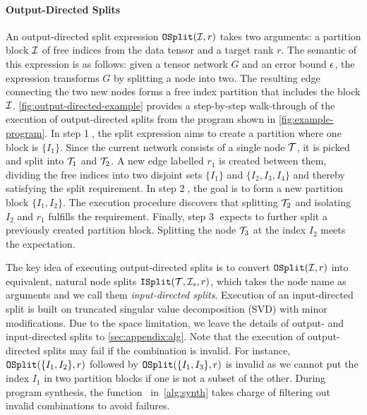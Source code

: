 \paragraph{Output-Directed Splits}
%
An output-directed split expression $\mathtt{OSplit}(\mathcal{I}, r)$ takes two arguments: a partition block $\mathcal{I}$ of free indices from the data tensor and a target rank $r$.
%
The semantic of this expression is as follows: given a tensor network $G$ and an error bound $\epsilon$, the expression transforms $G$ by splitting a node into two.
%
The resulting edge connecting the two new nodes forms a free index partition that includes the block $\mathcal{I}$.
%
\cref{fig:output-directed-example} provides a step-by-step walk-through of the execution of output-directed splits from the program shown in \cref{fig:example-program}.
%
In step \textcircled{\scriptsize 1}, the split expression aims to create a partition where one block is $\{I_1\}$.
%
Since the current network consists of a single node $\mathcal{T}$, it is picked and split into $\mathcal{T}_1$ and $\mathcal{T}_2$.
%
A new edge labelled $r_1$ is created between them, dividing the free indices into two disjoint sets $\{I_1\}$ and $\{I_2, I_3, I_4\}$ and thereby satisfying the split requirement.
%
In step \textcircled{\scriptsize 2}, the goal is to form a new partition block $\{I_1, I_2\}$.
%
The execution procedure discovers that splitting $\mathcal{T}_2$ and isolating $I_2$ and $r_1$ fulfills the requirement.
%
Finally, step \textcircled{\scriptsize 3} expects to further split a previously created partition block.
%
Splitting the node $\mathcal{T}_3$ at the index $I_2$ meets the expectation.

The key idea of executing output-directed splits is to convert $\mathtt{OSplit}(\mathcal{I}, r)$ into equivalent, natural node splits $\mathtt{ISplit}(\mathcal{T}, \mathcal{I}_s, r)$, which takes the node name as arguments and we call them \emph{input-directed splits}.
%
Execution of an input-directed split is built on truncated singular value decomposition (SVD) with minor modifications.
%
Due to the space limitation, we leave the details of output- and input-directed splits to \cref{sec:appendix:alg}.
%
Note that the execution of output-directed splits may fail if the combination  is invalid.
%
For instance, $\mathtt{OSplit}(\{I_1, I_2\}, r)$ followed by $\mathtt{OSplit}(\{I_1, I_3\}, r)$ is invalid as we cannot put the index $I_1$ in two partition blocks if one is not a subset of the other.
%
%
During program synthesis, the function \validexpr\ in~\cref{alg:synth} takes charge of filtering out invalid combinations to avoid failures.
%

